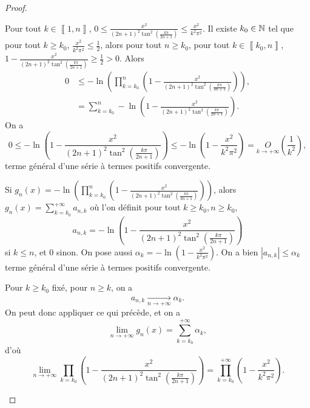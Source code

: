 \documentclass[12pt]{article}
\begin{document}
\begin{proof}
\begin{enumerate}
    Pour tout $k\in\left\llbracket1,n\right\rrbracket$, $0\leqslant\frac{x^{2}}{(2n+1)^{2}\tan^{2}\left(\frac{k\pi}{2n+1}\right)}\leqslant\frac{x^{2}}{k^{2}\pi^{2}}$. Il existe $k_{0}\in\mathbb{N}$ tel que pour tout $k\geqslant k_{0}$, $\frac{x^{2}}{k^{2}\pi^{2}}\leqslant\frac{1}{2}$, alors pour tout $n\geqslant k_{0}$, pour tout $k\in\left\llbracket k_{0},n\right\rrbracket$, $1-\frac{x^{2}}{(2n+1)^{2}\tan^{2}\left(\frac{k\pi}{2n+1}\right)}\geqslant\frac{1}{2}>0$. Alors 
    \begin{align*}
        0&
        \leqslant -\ln\left(\prod_{k=k_{0}}^{n}\left(1-\frac{x^{2}}{\left(2n+1\right)^{2}\tan^{2}\left(\frac{k\pi}{3n+1}\right)}\right)\right),\\
        &=\sum_{k=k_{0}}^{n}-\ln\left(1-\frac{x^{2}}{(2n+1)^{2}\tan^{2}\left(\frac{k\pi}{2n+1}\right)}\right).
    \end{align*}
    On a 
    \begin{equation*}
        0\leqslant-\ln\left(1-\frac{x^{2}}{(2n+1)^{2}\tan^{2}\left(\frac{k\pi}{2n+1}\right)}\right)\leqslant-\ln\left(1-\frac{x^{2}}{k^{2}\pi^{2}}\right)=\underset{k\to+\infty}{O}\left(\frac{1}{k^{2}}\right),
    \end{equation*}
    terme général d'une série à termes positifs convergente.

    Si $g_{n}(x)=-\ln\left(\prod_{k=k_{0}}^{n}\left(1-\frac{x^{2}}{\left(2n+1\right)^{2}\tan^{2}\left(\frac{k\pi}{3n+1}\right)}\right)\right)$, alors $g_{n}(x)=\sum_{k=k_{0}}^{+\infty}a_{n,k}$ où l'on définit pour tout $k\geqslant k_{0},n\geqslant k_{0}$,
    \begin{equation*}
        a_{n,k}=-\ln\left(1-\frac{x^{2}}{(2n+1)^{2}\tan^{2}\left(\frac{k\pi}{2n+1}\right)}\right)
    \end{equation*}
    si $k\leqslant n$, et 0 sinon. On pose aussi $\alpha_{k}=-\ln\left(1-\frac{x^{2}}{k^{2}\pi^{2}}\right)$. On a bien $\left\lvert a_{n,k}\right\rvert\leqslant\alpha_{k}$ terme général d'une série à termes positifs convergente.

    Pour $k\geqslant k_{0}$ fixé, pour $n\geqslant k$, on a 
    \begin{equation*}
        a_{n,k}\xrightarrow[n\to+\infty]{}\alpha_{k}.
    \end{equation*}
    On peut donc appliquer ce qui précède, et on a 
    \begin{equation*}
        \lim\limits_{n\to+\infty}g_{n}(x)=\sum_{k=k_{0}}^{+\infty}\alpha_{k},
    \end{equation*}
    d'où
    \begin{equation*}
        \lim\limits_{n\to+\infty}\prod_{k=k_{0}}\left(1-\frac{x^{2}}{(2n+1)^{2}\tan^{2}\left(\frac{k\pi}{2n+1}\right)}\right)=\prod_{k=k_{0}}^{+\infty}\left(1-\frac{x^{2}}{k^{2}\pi^{2}}\right).
    \end{equation*}


\end{enumerate}
\end{proof}
\end{document}
